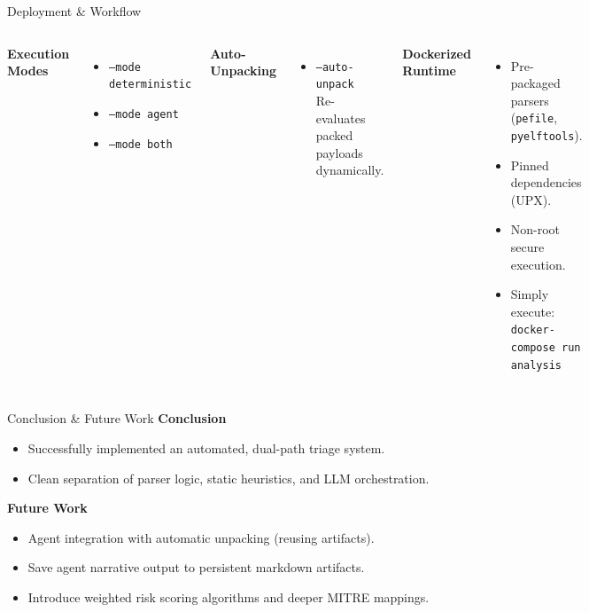 \documentclass[aspectratio=169,11pt]{beamer}
\begin{document}
\begin{frame}{Deployment \& Workflow}
    \begin{columns}[T]
        \textbf{\color{primary}Execution Modes}
        \vspace{0.5em}
        \begin{itemize}
            \item \texttt{--mode deterministic}
            \item \texttt{--mode agent}
            \item \texttt{--mode both}
        \end{itemize}
        
        \vspace{1em}
        \textbf{\color{primary}Auto-Unpacking}
        \vspace{0.5em}
        \begin{itemize}
            \item \texttt{--auto-unpack} \\ Re-evaluates packed payloads dynamically.
        \end{itemize}
        
        \textbf{\color{primary}Dockerized Runtime}
        \vspace{0.5em}
        \begin{itemize}
            \item Pre-packaged parsers (\texttt{pefile}, \texttt{pyelftools}).
            \item Pinned dependencies (UPX).
            \item Non-root secure execution.
            \item Simply execute: \\ \texttt{docker-compose run analysis}
        \end{itemize}
    \end{columns}
\end{frame}

\begin{frame}{Conclusion \& Future Work}
    \textbf{Conclusion}
    \begin{itemize}
        \item Successfully implemented an automated, dual-path triage system.
        \item Clean separation of parser logic, static heuristics, and LLM orchestration.
    \end{itemize}
    
    \vspace{1.5em}
    \textbf{Future Work}
    \begin{itemize}
        \item Agent integration with automatic unpacking (reusing artifacts).
        \item Save agent narrative output to persistent markdown artifacts.
        \item Introduce weighted risk scoring algorithms and deeper MITRE mappings.
    \end{itemize}
\end{frame}
\end{document}
